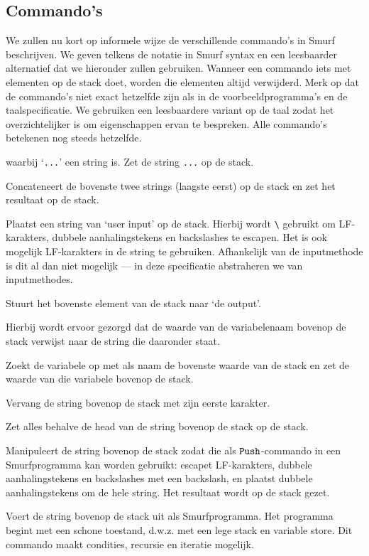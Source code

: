 \subsection{Commando's}
\label{sec:intro:commands}
We zullen nu kort op informele wijze de verschillende commando's in Smurf
beschrijven. We geven telkens de notatie in Smurf syntax en een leesbaarder
alternatief dat we hieronder zullen gebruiken. Wanneer een commando iets met
elementen op de stack doet, worden die elementen altijd verwijderd.
Merk op dat de commando's niet exact hetzelfde zijn als in de
voorbeeldprogramma's en de taalspecificatie. We gebruiken een leesbaardere
variant op de taal zodat het overzichtelijker is om eigenschappen ervan te
bespreken. Alle commando's betekenen nog steeds hetzelfde.

\begin{description}[style=nextline,font=\normalfont]
	\item[\smurfinline{"..."} of $\StmPush~\texttt{...}$]
		waarbij `\texttt{...}' een string is. Zet de string \texttt{...} op de
		stack.
	\item[\smurfinline{+} of $\StmCat$]
		Concateneert de bovenste twee strings (laagste eerst) op de stack en zet
		het resultaat op de stack.
	\item[\smurfinline{i} of $\StmInput$]
		Plaatst een string van `user input' op de stack. Hierbij wordt
		\texttt{\textbackslash} gebruikt om LF-karakters, dubbele aanhalingstekens
		en backslashes te escapen. Het is ook mogelijk LF-karakters in de string te
		gebruiken. Afhankelijk van de inputmethode is dit al dan niet mogelijk ---
		in deze specificatie abstraheren we van inputmethodes.
	\item[\smurfinline{o} of $\StmOutput$]
		Stuurt het bovenste element van de stack naar `de output'.
	\item[\smurfinline{p} of $\StmPut$]
		Hierbij wordt ervoor gezorgd dat de waarde van de variabelenaam bovenop de
		stack verwijst naar de string die daaronder staat.
    \item[\smurfinline{g} of $\StmGet$]
		Zoekt de variabele op met als naam de bovenste waarde van de stack en zet de waarde van die variabele bovenop de stack.
	\item[\smurfinline{h} of $\StmHead$]
		Vervang de string bovenop de stack met zijn eerste karakter.
	\item[\smurfinline{t} of $\StmTail$]
		Zet alles behalve de head van de string bovenop de stack op de stack.
	\item[\smurfinline{q} of $\StmQuotify$]
		Manipuleert de string bovenop de stack zodat die als $\texttt{Push}$-commando in
		een Smurfprogramma kan worden gebruikt: escapet LF-karakters, dubbele
		aanhalingstekens en back\-slashes met een backslash, en plaatst dubbele
		aanhalingstekens om de hele string. Het resultaat wordt op de stack gezet.
	\item[\smurfinline{x} of $\StmExec$]
		Voert de string bovenop de stack uit als Smurfprogramma. Het programma
		begint met een schone toestand, d.w.z. met een lege stack en variable
		store. Dit commando maakt condities, recursie en iteratie mogelijk.
\end{description}

